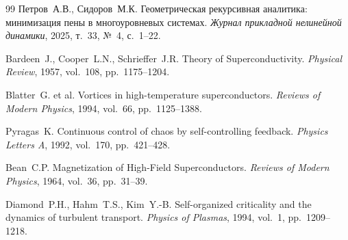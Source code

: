 \documentclass[12pt,a4paper]{article}
\numberwithin{equation}{section}
\begin{document}
\begin{thebibliography}{99}
 Петров~А.В., Сидоров~М.К. Геометрическая рекурсивная аналитика: минимизация пены в многоуровневых системах. \textit{Журнал прикладной нелинейной динамики}, 2025, т.~33, №~4, с.~1--22.

 Bardeen~J., Cooper~L.N., Schrieffer~J.R. Theory of Superconductivity. \textit{Physical Review}, 1957, vol.~108, pp.~1175--1204.

 Blatter~G. et al. Vortices in high-temperature superconductors. \textit{Reviews of Modern Physics}, 1994, vol.~66, pp.~1125--1388.

 Pyragas~K. Continuous control of chaos by self-controlling feedback. \textit{Physics Letters A}, 1992, vol.~170, pp.~421--428.

 Bean~C.P. Magnetization of High-Field Superconductors. \textit{Reviews of Modern Physics}, 1964, vol.~36, pp.~31--39.

 Diamond~P.H., Hahm~T.S., Kim~Y.-B. Self-organized criticality and the dynamics of turbulent transport. \textit{Physics of Plasmas}, 1994, vol.~1, pp.~1209--1218.

\end{thebibliography}
\end{document}
